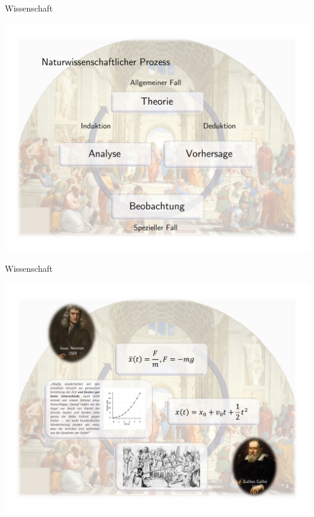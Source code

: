 \documentclass[
  8pt,
  ignorenonframetext,
]{beamer}
\begin{document}
\begin{frame}{Wissenschaft}
\protect\hypertarget{wissenschaft-3}{}
\begin{center}\includegraphics[width=0.95\linewidth]{1_Abbildungen/pfm_1_wissenschaft_prozess} \end{center}
\end{frame}

\begin{frame}{Wissenschaft}
\protect\hypertarget{wissenschaft-4}{}
\begin{center}\includegraphics[width=0.95\linewidth]{1_Abbildungen/pfm_1_wissenschaft_prozess_freierfall} \end{center}
\end{frame}
\end{document}
